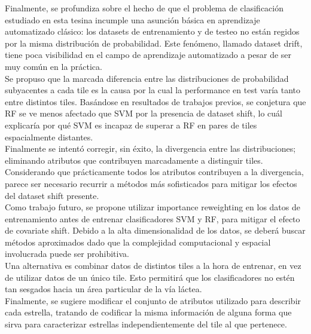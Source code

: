 Finalmente, se profundiza sobre el hecho de que el problema de clasificación estudiado en esta tesina incumple una asunción básica en aprendizaje automatizado clásico: los datasets de entrenamiento y de testeo no están regidos por la misma distribución de probabilidad. Este fenómeno, llamado dataset drift, tiene poca visibilidad en el campo de aprendizaje automatizado a pesar de ser muy común en la práctica. \\

Se propuso que la marcada diferencia entre las distribuciones de probabilidad subyacentes a cada tile es la causa por la cual la performance en test varía tanto entre distintos tiles. Basándose en resultados de trabajos previos, se conjetura que RF se ve menos afectado que SVM por la presencia de dataset shift, lo cuál explicaría por qué SVM es incapaz de superar a RF en pares de tiles espacialmente distantes. \\

Finalmente se intentó corregir, sin éxito, la divergencia entre las distribuciones; eliminando atributos que contribuyen marcadamente a distinguir tiles. Considerando que prácticamente todos los atributos contribuyen a la divergencia, parece ser necesario recurrir a métodos más sofisticados para mitigar los efectos del dataset shift presente. \\

Como trabajo futuro, se propone utilizar importance reweighting en los datos de entrenamiento antes de entrenar clasificadores SVM y RF, para mitigar el efecto de covariate shift. Debido a la alta dimensionalidad de los datos, se deberá buscar métodos aproximados dado que la complejidad computacional y espacial involucrada puede ser prohibitiva. \\

Una alternativa es combinar datos de distintos tiles a la hora de entrenar, en vez de utilizar datos de un único tile. Esto permitirá que los clasificadores no estén tan sesgados hacia un área particular de la vía láctea. \\

Finalmente, se sugiere modificar el conjunto de atributos utilizado para describir cada estrella, tratando de codificar la misma información de alguna forma que sirva para caracterizar estrellas independientemente del tile al que pertenece.